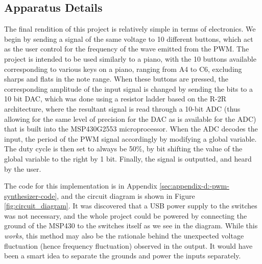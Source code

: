 \subsection{Apparatus Details}\label{subsec:apparatus-details}

The final rendition of this project is relatively simple in terms of electronics.
We begin by sending a signal of the same voltage to 10 different buttons, which act as the user control for the frequency of the wave emitted from the PWM\@.
The project is intended to be used similarly to a piano, with the 10 buttons available corresponding to various keys on a piano, ranging from A4 to C6, excluding sharps and flats in the note range.
When these buttons are pressed, the corresponding amplitude of the input signal is changed by sending the bits to a 10 bit DAC, which was done using a resistor ladder based on the R-2R architecture, where the resultant signal is read through a 10-bit ADC (thus allowing for the same level of precision for the DAC as is available for the ADC) that is built into the MSP430G2553 microprocessor. 
When the ADC decodes the input, the period of the PWM signal accordingly by modifying a global variable.
The duty cycle is then set to always be 50\%, by bit shifting the value of the global variable to the right by 1 bit.
Finally, the signal is outputted, and heard by the user. 

The code for this implementation is in Appendix \ref{sec:appendix-d:-pwm-synthesizer-code}, and the circuit diagram is shown in Figure \ref{fig:circuit_diagram}. It was discovered that a USB power supply to the switches was not necessary, and the whole project could be powered by connecting the ground of the MSP430 to the switches itself as we see in the diagram. While this \textit{works}, this method may also be the rationale behind the unexpected voltage fluctuation (hence frequency fluctuation) observed in the output. It would have been a smart idea to separate the grounds and power the inputs separately. 


